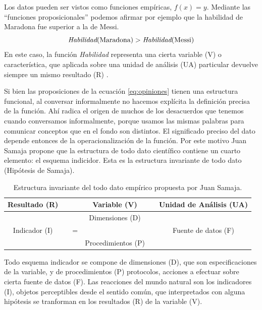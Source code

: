\documentclass[a4paper,10pt]{book}
\begin{document}
Los datos pueden ser vistos como funciones empíricas, $f(x)=y$.
Mediante las ``funciones proposicionales'' podemos afirmar por ejemplo que la habilidad de Maradona fue superior a la de Messi.
\begin{equation}\label{eq:opiniones}
 \emph{Habilidad}(\text{Maradona}) > \emph{Habilidad}(\text{Messi})
\end{equation}
En este caso, la función \emph{Habilidad} representa una cierta variable (V) o característica, que aplicada sobre una unidad de análisis (UA) particular devuelve siempre un mismo resultado (R) .


Si bien las proposiciones de la ecuación \ref{eq:opiniones} tienen una estructura funcional, al conversar informalmente no hacemos explícita la definición precisa de la función.
Ahí radica el origen de muchos de los desacuerdos que tenemos cuando conversamos informalmente, porque usamos las mismas palabras para comunicar conceptos que en el fondo son distintos.
El significado preciso del dato depende entonces de la operacionalización de la función.
Por este motivo Juan Samaja propone que la estructura de todo dato científico contiene un cuarto elemento: el esquema indicidor.
Esta es la estructura invariante de todo dato (Hipótesis de Samaja).

\begin{table}[ht!]
\centering
\begin{tabular}{clcccc}
Resultado (R) & \multicolumn{1}{r|}{} &  & Variable (V) &  &  \multicolumn{1}{|c}{Unidad de Análisis (UA)} \\ \hline
   &  \multicolumn{1}{r|}{}    &  & Dimensiones (D) &  & \multicolumn{1}{|r}{} \\
                 Indicador (I)  &   & =  &  &  &  Fuente de datos (F) \\
 & \multicolumn{1}{r|}{} &  & Procedimientos (P) &        &    \multicolumn{1}{|r}{}  
\end{tabular}
\caption{Estructura invariante del todo dato empírico propuesta por Juan Samaja.}
\label{tab:matriz_datos}
\end{table}

Todo esquema indicador se compone de dimensiones (D), que son especificaciones de la variable, y de procedimientos (P) protocolos, acciones a efectuar sobre cierta fuente de datos (F).
Las reacciones del mundo natural son los indicadores (I), objetos perceptibles desde el sentido común, que interpretados con alguna hipótesis se tranforman en los resultados (R) de la variable (V).
\end{document}
